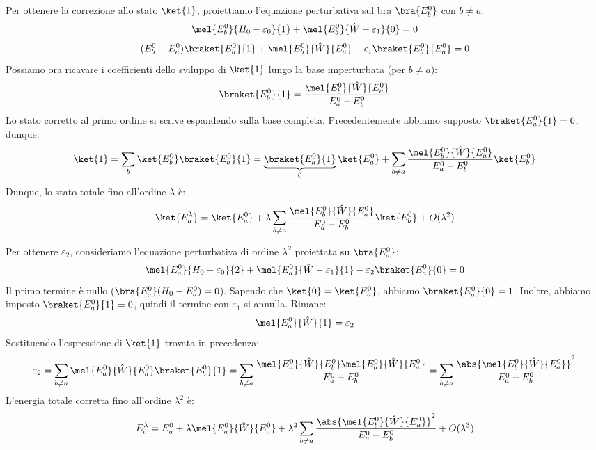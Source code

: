 Per ottenere la correzione allo stato \(\ket{1}\), proiettiamo l'equazione perturbativa sul bra \(\bra{E_b^0}\) con \(b \neq a\):
\[
    \mel{E_b^0}{H_0 - \varepsilon_0}{1} + \mel{E_b^0}{\hat{W} - \varepsilon_1}{0} = 0
\]
\[
    (E_b^0 - E_a^0) \braket{E_b^0}{1} + \mel{E_b^0}{\hat{W}}{E_a^0} -\epsilon_1\braket{E_b^0}{E_a^0} = 0
\]
Possiamo ora ricavare i coefficienti dello sviluppo di \(\ket{1}\) lungo la base imperturbata (per \(b \neq a\)):
\begin{equation}
    \braket{E_b^0}{1} = \frac{\mel{E_b^0}{\hat{W}}{E_a^0}}{E_a^0 - E_b^0}
\end{equation}
Lo stato corretto al primo ordine si scrive espandendo sulla base completa. Precedentemente abbiamo supposto \(\braket{E_a^0}{1} = 0\), dunque:
\[
    \ket{1} = \sum_{b} \ket{E_b^0}\braket{E_b^0}{1} = \underbrace{\braket{E_a^0}{1}}_{0} \ket{E_a^0} + \sum_{b \neq a} \frac{\mel{E_b^0}{\hat{W}}{E_a^0}}{E_a^0 - E_b^0} \ket{E_b^0}
\]
Dunque, lo stato totale fino all'ordine \(\lambda\) è:
\begin{equation}
    \ket{E_a^\lambda} = \ket{E_a^0} + \lambda \sum_{b \neq a} \frac{\mel{E_b^0}{\hat{W}}{E_a^0}}{E_a^0 - E_b^0} \ket{E_b^0} + O(\lambda^2)
\end{equation}


Per ottenere \(\varepsilon_2\), consideriamo l'equazione perturbativa di ordine \(\lambda^2\) proiettata su \(\bra{E_a^0}\):
\[
    \mel{E_a^0}{H_0 - \varepsilon_0}{2} + \mel{E_a^0}{\hat{W} - \varepsilon_1}{1} - \varepsilon_2 \braket{E_a^0}{0} = 0
\]
Il primo termine è nullo (\(\bra{E_a^0}(H_0 - E_a^0) = 0\)). Sapendo che \(\ket{0} = \ket{E_a^0}\), abbiamo \(\braket{E_a^0}{0} = 1\). Inoltre, abbiamo imposto \(\braket{E_a^0}{1} = 0\), quindi il termine con \(\varepsilon_1\) si annulla. Rimane:
\[
    \mel{E_a^0}{\hat{W}}{1} = \varepsilon_2
\]
Sostituendo l'espressione di \(\ket{1}\) trovata in precedenza:
\begin{equation}
    \varepsilon_2 = \sum_{b \neq a} \mel{E_a^0}{\hat{W}}{E_b^0} \braket{E_b^0}{1} 
        = \sum_{b \neq a} \frac{\mel{E_a^0}{\hat{W}}{E_b^0} \mel{E_b^0}{\hat{W}}{E_a^0}}{E_a^0 - E_b^0}
        = \sum_{b \neq a} \frac{\abs{\mel{E_b^0}{\hat{W}}{E_a^0}}^2}{E_a^0 - E_b^0}
\end{equation}
L'energia totale corretta fino all'ordine \(\lambda^2\) è:
\begin{equation}
    E_a^\lambda = E_a^0 + \lambda \mel{E_a^0}{\hat{W}}{E_a^0} + \lambda^2 \sum_{b \neq a} \frac{\abs{\mel{E_b^0}{\hat{W}}{E_a^0}}^2}{E_a^0 - E_b^0} + O(\lambda^3)
\end{equation}


